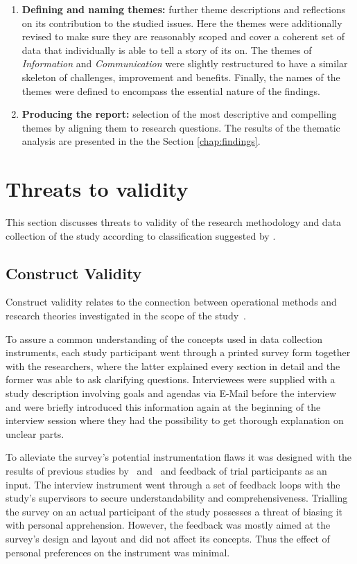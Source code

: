 \begin{enumerate}
  \item \textbf{Defining and naming themes:} further theme descriptions and reflections on its contribution to the studied issues. Here the themes were additionally revised to make sure they are reasonably scoped and cover a coherent set of data that individually is able to tell a story of its on. The themes of \emph{Information} and \emph{Communication} were slightly restructured to have a similar skeleton of challenges, improvement and benefits. Finally, the names of the themes were defined to encompass the essential nature of the findings.
  \item \textbf{Producing the report:} selection of the most descriptive and compelling themes by aligning them to research questions. The results of the thematic analysis are presented in the the Section \ref{chap:findings}.
\end{enumerate}

\section{Threats to validity}

This section discusses threats to validity of the research methodology and data collection of the study according to classification suggested by \citet{runeson}.

\subsection{Construct Validity}

Construct validity relates to the connection between operational methods and research theories investigated in the scope of the study~\citep{runeson}.

To assure a common understanding of the concepts used in data collection instruments, each study participant went through a printed survey form together with the researchers, where the latter explained every section in detail and the former was able to ask clarifying questions. Interviewees were supplied with a study description involving goals and agendas via E-Mail before the interview and were briefly introduced this information again at the beginning of the interview session where they had the possibility to get thorough explanation on unclear parts.

To alleviate the survey's potential instrumentation flaws it was designed with the results of previous studies by~\citet{nelson2013technicaldependencies} and~\citet{boerjesson2013} and feedback of trial participants as an input. The interview instrument went through a set of feedback loops with the study's supervisors to secure understandability and comprehensiveness. Trialling the survey on an actual participant of the study possesses a threat of biasing it with personal apprehension. However, the feedback was mostly aimed at the survey's design and layout and did not affect its concepts. Thus the effect of personal preferences on the instrument was minimal.

